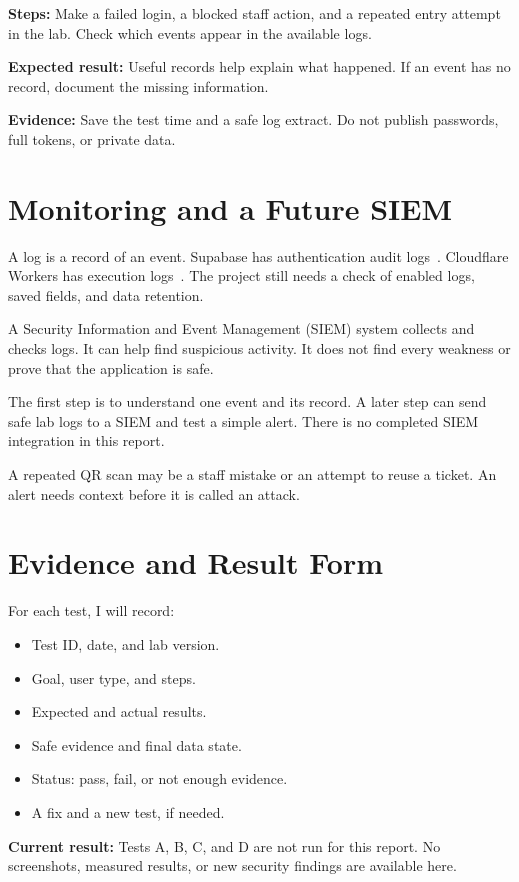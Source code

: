 \documentclass[conference]{IEEEtran}
\begin{document}
\textbf{Steps:} Make a failed login, a blocked staff action, and a repeated entry attempt in the lab. Check which events appear in the available logs.

\textbf{Expected result:} Useful records help explain what happened. If an event has no record, document the missing information.

\textbf{Evidence:} Save the test time and a safe log extract. Do not publish passwords, full tokens, or private data.

\section{Monitoring and a Future SIEM}
A log is a record of an event. Supabase has authentication audit logs~\cite{supabase}. Cloudflare Workers has execution logs~\cite{cloudflare}. The project still needs a check of enabled logs, saved fields, and data retention.

A Security Information and Event Management (SIEM) system collects and checks logs. It can help find suspicious activity. It does not find every weakness or prove that the application is safe.

The first step is to understand one event and its record. A later step can send safe lab logs to a SIEM and test a simple alert. There is no completed SIEM integration in this report.

A repeated QR scan may be a staff mistake or an attempt to reuse a ticket. An alert needs context before it is called an attack.

\section{Evidence and Result Form}
For each test, I will record:
\begin{itemize}
\item Test ID, date, and lab version.
\item Goal, user type, and steps.
\item Expected and actual results.
\item Safe evidence and final data state.
\item Status: pass, fail, or not enough evidence.
\item A fix and a new test, if needed.
\end{itemize}

\textbf{Current result:} Tests A, B, C, and D are not run for this report. No screenshots, measured results, or new security findings are available here.
\end{document}
